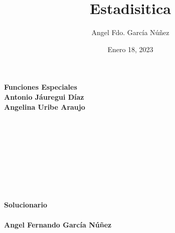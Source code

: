\documentclass[10pt,a4papper]{article}
\author{Angel Fdo. García Núñez}
\date{Enero 18, 2023}
\title{Estadisitica}
\begin{document}
\Huge
\textbf{Funciones Especiales}\\

\large
\textbf{Antonio Jáuregui Díaz}\\
\textbf{Angelina Uribe Araujo}\\\\\\\\\\\\\\\\\\\\

\Large
\textbf{Solucionario}\\\\
\large
\textbf{Angel Fernando García Núñez}

\Large
\newpage

\newpage

\newpage

\newpage

\newpage

\newpage

\newpage

\newpage

\newpage

\newpage

\newpage

\newpage

\newpage

\newpage

\newpage

\newpage

\newpage

\newpage

\newpage

\newpage

\newpage

\newpage

\newpage

\newpage

\newpage

\newpage

\newpage

\newpage

\newpage

\newpage

\newpage

\newpage

\newpage
\end{document}

